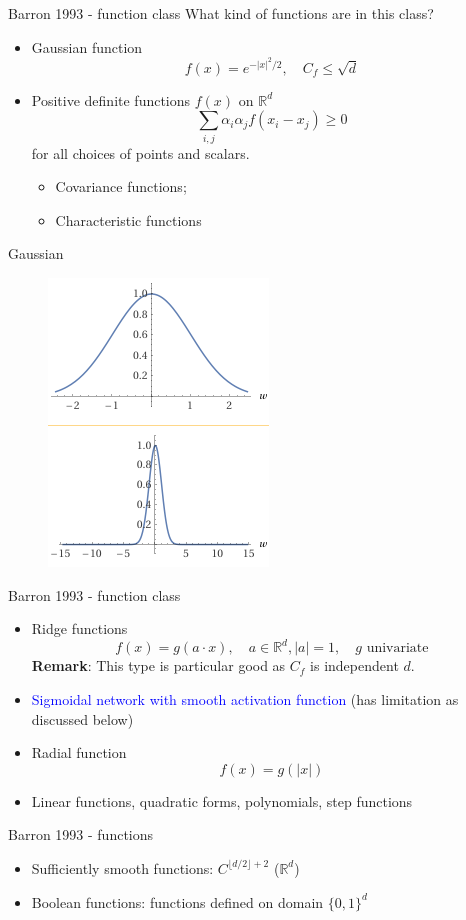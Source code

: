 \documentclass[aspectratio=169]{beamer} %
\begin{document}
\begin{frame}{Barron 1993 - function class}
What kind of functions are in this class?
\begin{itemize}
    \item Gaussian function
    $$
    f(x) = e^{-|x|^2/2},\quad C_f\le \sqrt{d}
    $$
    \item Positive definite functions $f(x)$ on $\mathbb{R}^d$
    $$
    \sum_{i,j} \alpha_i\alpha_j f(x_i-x_j)\ge 0
    $$
    for all choices of points and scalars.
    \begin{itemize}
        \item Covariance functions; 
        \item Characteristic functions
    \end{itemize}
    
\end{itemize}

\end{frame}
\begin{frame}{Gaussian}
\begin{figure}
    \centering
    \includegraphics[width=0.3\linewidth]{Reinforcement Learning/Curse of Dimensionality/gaussian.png}
\end{figure}
    
\end{frame}
\begin{frame}{Barron 1993 - function class}
\begin{itemize}
    \item Ridge functions
    $$
    f(x) = g(a\cdot x),\quad a\in\mathbb{R}^d, |a|=1, \quad g\text{ univariate}
    $$
    \textbf{Remark}: This type is particular good as $C_f$ is independent $d$.
    \item \textcolor{blue}{Sigmoidal network with smooth activation function} (has limitation as discussed below)
    \item Radial function
    $$
    f(x) = g(|x|)
    $$
    \item Linear functions, quadratic forms, polynomials, step functions
\end{itemize}
\end{frame}
\begin{frame}{Barron 1993 - functions}
\begin{itemize}
    \item Sufficiently smooth functions: $C^{\lfloor d/2\rfloor+2}$ ($\mathbb{R}^d$)
    \item Boolean functions: functions defined on domain $\{0,1\}^d$
\end{itemize}
    
\end{frame}
\end{document}
